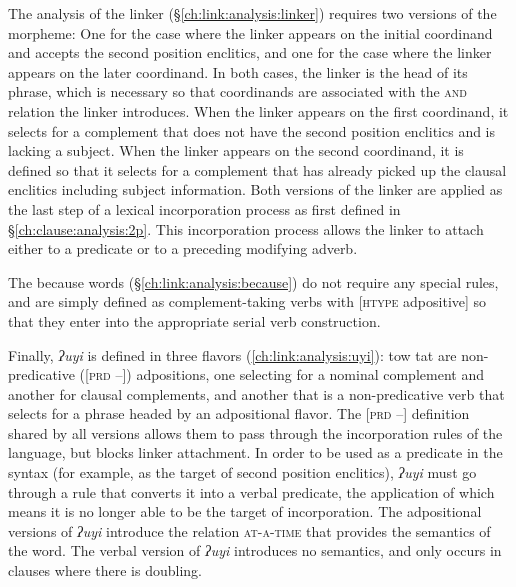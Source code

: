 The analysis of the linker (\S\ref{ch:link:analysis:linker}) requires two versions of the morpheme: One for the case where the linker appears on the initial coordinand and accepts the second position enclitics, and one for the case where the linker appears on the later coordinand. In both cases, the linker is the head of its phrase, which is necessary so that coordinands are associated with the \textsc{and} relation the linker introduces. When the linker appears on the first coordinand, it selects for a complement that does not have the second position enclitics and is lacking a subject. When the linker appears on the second coordinand, it is defined so that it selects for a complement that has already picked up the clausal enclitics including subject information. Both versions of the linker are applied as the last step of a lexical incorporation process as first defined in \S\ref{ch:clause:analysis:2p}. This incorporation process allows the linker to attach either to a predicate or to a preceding modifying adverb.

The because words (\S\ref{ch:link:analysis:because}) do not require any special rules, and are simply defined as complement-taking verbs with [\textsc{htype} adpositive] so that they enter into the appropriate serial verb construction.

Finally, \textit{ʔuyi} is defined in three flavors (\ref{ch:link:analysis:uyi}): tow tat are non-predicative ([\textsc{prd} --]) adpositions, one selecting for a nominal complement and another for clausal complements, and another that is a non-predicative verb that selects for a phrase headed by an adpositional flavor. The [\textsc{prd} --] definition shared by all versions allows them to pass through the incorporation rules of the language, but blocks linker attachment. In order to be used as a predicate in the syntax (for example, as the target of second position enclitics), \textit{ʔuyi} must go through a rule that converts it into a verbal predicate, the application of which means it is no longer able to be the target of incorporation. The adpositional versions of \textit{ʔuyi} introduce the relation \textsc{at-a-time} that provides the semantics of the word. The verbal version of \textit{ʔuyi} introduces no semantics, and only occurs in clauses where there is doubling.